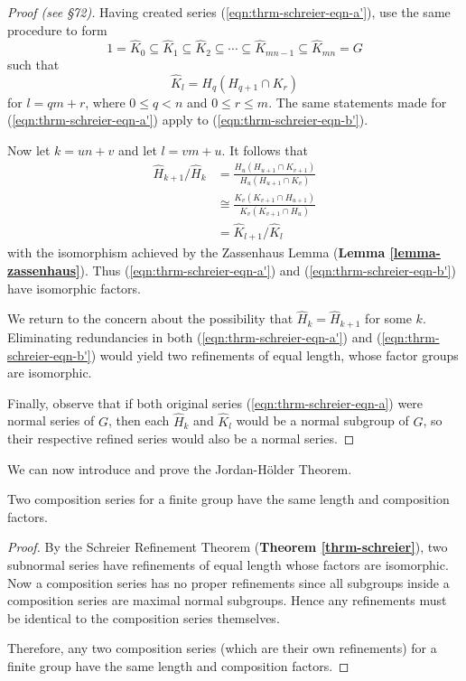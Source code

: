 \begin{proof}[Proof (see \cite{clark_1984} \S 72)]
    Having created series (\ref{eqn:thrm-schreier-eqn-a'}), use the same procedure to form
    \begin{equation}\label{eqn:thrm-schreier-eqn-b'}
        1 = \hat{K}_0 \subseteq \hat{K}_1 \subseteq \hat{K}_2 \subseteq \cdots \subseteq \hat{K}_{mn - 1} \subseteq \hat{K}_{mn} = G
        \tag{B'}
    \end{equation}
    such that
    \[
        \hat{K}_l = H_q(H_{q+1}\cap K_r)
    \]
    for $l = qm + r$, where $0 \leq q < n$ and $0 \leq r \leq m$. The same statements made for (\ref{eqn:thrm-schreier-eqn-a'}) apply to (\ref{eqn:thrm-schreier-eqn-b'}).
    
    Now let $k = un + v$ and let $l = vm + u$. It follows that
    \begin{align*}
        \hat{H}_{k+1}/\hat{H}_k &= \frac{H_u(H_{u+1}\cap K_{v+1})}{H_u(H_{u+1}\cap K_v)}\\
        &\cong \frac{K_v(K_{v+1}\cap H_{u+1})}{K_v(K_{v+1}\cap H_u)}\\
        &= \hat{K}_{l+1}/\hat{K}_l
    \end{align*}
    with the isomorphism achieved by the Zassenhaus Lemma (\textbf{Lemma \ref{lemma-zassenhaus}}). Thus (\ref{eqn:thrm-schreier-eqn-a'}) and (\ref{eqn:thrm-schreier-eqn-b'}) have isomorphic factors.
    
    We return to the concern about the possibility that $\hat{H}_k = \hat{H}_{k+1}$ for some $k$. Eliminating redundancies in both (\ref{eqn:thrm-schreier-eqn-a'}) and (\ref{eqn:thrm-schreier-eqn-b'}) would yield two refinements of equal length, whose factor groups are isomorphic.
    
    Finally, observe that if both original series (\ref{eqn:thrm-schreier-eqn-a}) were normal series of $G$, then each $\hat{H}_k$ and $\hat{K}_l$ would be a normal subgroup of $G$, so their respective refined series would also be a normal series.
\end{proof}

We can now introduce and prove the Jordan-H\"older Theorem.
\begin{theorem}\label{thrm-jordan-holder}
    Two composition series for a finite group have the same length and composition factors.
\end{theorem}
\begin{proof}
    By the Schreier Refinement Theorem (\textbf{Theorem \ref{thrm-schreier}}), two subnormal series have refinements of equal length whose factors are isomorphic. Now a composition series has no proper refinements since all subgroups inside a composition series are maximal normal subgroups. Hence any refinements must be identical to the composition series themselves.
    
    Therefore, any two composition series (which are their own refinements) for a finite group have the same length and composition factors.
\end{proof}

